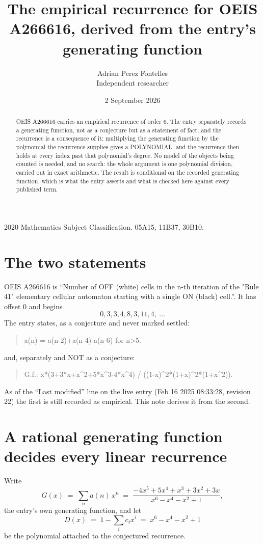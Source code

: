 \documentclass[11pt,a4paper]{article}
\title{The empirical recurrence for OEIS A266616, derived from the entry's generating function}
\author{Adrian Perez Fontelles\\ \small Independent researcher}
\date{2 September 2026}
\theoremstyle{plain}
\theoremstyle{definition}
\begin{document}
\maketitle

\begin{abstract}
OEIS A266616 carries an empirical recurrence of order $6$. The entry separately records a
generating function, not as a conjecture but as a statement of fact, and the recurrence is a
consequence of it: multiplying the generating function by the polynomial the recurrence
supplies gives a POLYNOMIAL, and the recurrence then holds at every index past that
polynomial's degree. No model of the objects being counted is needed, and no search: the
whole argument is one polynomial division, carried out in exact arithmetic. The result is
conditional on the recorded generating function, which is what the entry asserts and what is
checked here against every published term.
\end{abstract}

\noindent\small 2020 Mathematics Subject Classification. 05A15, 11B37, 30B10.\normalsize

\section{The two statements}

OEIS A266616 is ``Number of OFF (white) cells in the n-th iteration of the "Rule 41" elementary cellular automaton starting with a single ON (black) cell.''. It has offset $0$ and begins
\[
0, 3, 3, 4, 8, 3, 11, 4,\ \dots
\]
The entry states, as a conjecture and never marked settled:
\begin{quote}
a(n) = a(n-2)+a(n-4)-a(n-6) for n>5.
\end{quote}
and, separately and NOT as a conjecture:
\begin{quote}
G.f.: x*(3+3*x+x\^{}2+5*x\^{}3-4*x\^{}4) / ((1-x)\^{}2*(1+x)\^{}2*(1+x\^{}2)).
\end{quote}
As of the ``Last modified'' line on the live entry (Feb 16 2025 08:33:28, revision 22) the first is still
recorded as empirical. This note derives it from the second.

\section{A rational generating function decides every linear recurrence}

Write
\[
G(x)\;=\;\sum_{n}a(n)\,x^{n}\;=\;\frac{- 4 x^{5} + 5 x^{4} + x^{3} + 3 x^{2} + 3 x}{x^{6} - x^{4} - x^{2} + 1},
\]
the entry's own generating function, and let
\[
D(x)\;=\;1-\sum_i c_i x^{i}\;=\;x^{6} - x^{4} - x^{2} + 1
\]
be the polynomial attached to the conjectured recurrence.
\end{document}
